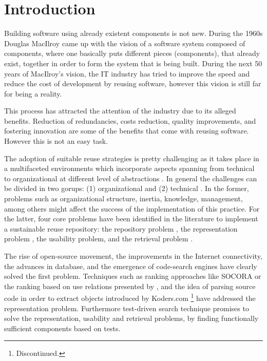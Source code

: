 \chapter{Introduction}
\label{chap:introduction}
Building software using already existent components is not new. During the 1960s Douglas MacIlroy came up with the vision of a software system composed of components, where one basically puts different pieces (components), that already exist, together in order to form the system that is being built. During the next 50 years of MacIlroy's vision, the IT industry has tried to improve the speed and reduce the cost of development by reusing software, however this vision is still far for being a reality.

This process has attracted the attention of the industry due to its alleged benefits. Reduction of redundancies, costs reduction, quality improvements, and fostering innovation are some of the benefits that come with reusing software. However this is not an easy task.

The adoption of suitable reuse strategies is pretty challenging as it takes place in a multifaceted environments which incorporate aspects spanning from technical to organizational at different level of abstractions \cite{Bauer2016}. In general the challenges can be divided in two gorups: (1) organizational and (2) technical \cite{Hummel2013,Bauer2016}. In the former, problems such as organizational structure, inertia, knowledge, management, among others might affect the success of the implementation of this practice. For the latter, four core problems have been identified in the literature to implement a sustainable reuse repository: the repository problem \cite{Seacord1999}, the representation problem \cite{Pole1994}, the usability problem\cite{Garcia2006}, and the retrieval problem \cite{Prieto-Diaz1987}.

The rise of open-source movement, the improvements in the Internet connectivity, the advances in database, and the emergence of code-search engines have clearly solved the first problem. Techniques such as ranking approaches like SOCORA \cite{Kessel2016} or the ranking based on use relations presented by \citeauthor{Inoue2005}, and the idea of parsing source code in order to extract objects introduced by Koders.com \footnote{Discontinued.} have addressed the representation problem. Furthermore test-driven search technique \cite{Hummel2004,Hummel2013} promises to solve the representation, usability and retrieval problems, by finding functionally sufficient components based on tests.

